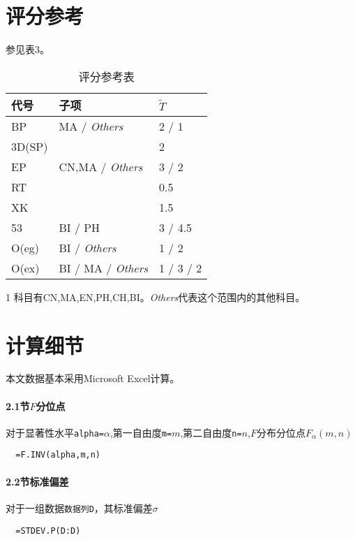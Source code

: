 \documentclass{article}
\begin{document}
\begin{CJK}{UTF8}{song}
\section{评分参考}
参见表3。
\begin{table}[tbp]
\caption{评分参考表}
\begin{center}
\begin{threeparttable}[b]
\begin{tabular}{lll}
  \toprule
  代号 & 子项 & $\tilde{T}$ \\
  \midrule
  BP & MA / \textit{Others}\tnote{1} & 2 / 1 \\
  3D(SP) &  & 2 \\
  EP & CN,MA / \textit{Others} & 3 / 2 \\
  RT &  & 0.5 \\
  XK &  & 1.5 \\
  53 & BI / PH & 3 / 4.5 \\
  O(eg) & BI / \textit{Others} & 1 / 2 \\
  O(ex) & BI / MA / \textit{Others} & 1 / 3 / 2 \\
  \bottomrule
  \end{tabular}
  \begin{tablenotes}
  \item[1] 科目有CN,MA,EN,PH,CH,BI。\textit{Others}代表这个范围内的其他科目。
  \end{tablenotes}
\end{threeparttable}
\end{center}
\end{table}

\section{计算细节}
本文数据基本采用Microsoft Excel计算。
\paragraph{2.1节$F$分位点}
对于显著性水平\verb"alpha="$\alpha$,第一自由度\verb"m="$m$,第二自由度\verb"n="$n$,$F$分布分位点$F_{\alpha}(m,n)$
\begin{verbatim}
  =F.INV(alpha,m,n)
\end{verbatim}

\paragraph{2.2节标准偏差}
对于一组数据\verb"数据列D"，其标准偏差$\sigma$
\begin{verbatim}
  =STDEV.P(D:D)
\end{verbatim}


\end{CJK}
\end{document}
